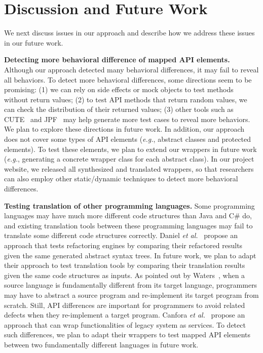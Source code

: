 

\section{Discussion and Future Work}
\label{sec:discuss}

We next discuss issues in our approach and describe how we address
these issues in our future work.

\textbf{Detecting more behavioral difference of mapped API elements.} Although our approach detected many behavioral differences, it may fail to reveal all behaviors. To detect more behavioral differences, some directions seem to be promising: (1) we can rely on side effects or  mock objects to test methods without return values; (2) to test API methods that return random values, we can check the distribution of their returned values; (3) other tools such as CUTE~\cite{koushik:cute} and JPF~\cite{visser2003mcp} may help generate more test cases to reveal more behaviors. We plan to explore these directions in future work. In addition, our approach does not cover some types of API elements (\emph{e.g.}, abstract classes and protected elements). To test these elements, we plan to extend our wrappers in future work (\emph{e.g.}, generating a concrete wrapper class for each abstract class). In our project website, we released all synthesized and translated wrappers, so that researchers can also employ other static/dynamic techniques to detect more behavioral differences.

\textbf{Testing translation of other programming languages.} Some programming languages may have much more different code structures than Java and C\# do, and existing translation tools between these programming languages may fail to translate some different code structures correctly. Daniel \emph{et al.}~\cite{daniel2007automated} propose an approach that tests refactoring engines by comparing their refactored results given the same generated abstract syntax trees. In future work, we plan to adapt their approach to test translation tools by comparing their translation results given the same code structures as inputs. As pointed out by Waters~\cite{waters1988program}, when a source language is fundamentally different from its target language, programmers may have to abstract a source program and re-implement its target program from scratch. Still, API differences are important for programmers to avoid related defects when they re-implement a target program. Canfora \emph{et al.}~\cite{CanforaFFT08} propose an approach that can wrap functionalities of legacy system as services. To detect such differences, we plan to adapt their wrappers to test mapped API elements between two fundamentally different languages in future work.

